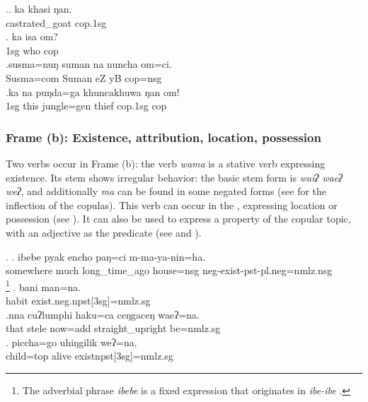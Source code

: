  \ex.\ag. ka khasi ŋan.\\
	 castrated\_goat  {\sc cop.1sg} \\
	 
\bg. ka isa om?\\
{\sc 1sg} who {\sc cop}\\
\bg.susma=nuŋ    suman  na           nuncha           om=ci.\\
Susma{\sc =com} Suman eZ yB {\sc cop=nsg}\\
 
\bg.ka  na   puŋda=ga    khuncakhuwa ŋan    om!\\
{\sc 1sg} this jungle{\sc =gen} thief  {\sc cop.1sg} {\sc cop}\\
 


\subsubsection{Frame (b): Existence, attribution, location, possession}

Two verbs occur in Frame (b): the verb  \emph{wama}   is a stative verb expressing existence.  Its stem shows irregular behavior: the basic stem form is \emph{waiʔ \ti waeʔ \ti weʔ}, and additionally \emph{ma} can be found in some negated forms (see  for the inflection of the copulas). This verb can occur in the , expressing location or possession (see \Next[a]). It can also be used to express a property of the copular topic, with an adjective as the predicate (see \Next[b] and \Next[c]).

	\ex. \ag. ibebe    pyak encho         paŋ=ci    m-ma-ya-nin=ha.\\
somewhere much long\_time\_ago house{\sc =nsg} {\sc neg-}exist{\sc -pst-pl.neg=nmlz.nsg}\\
  \footnote{The adverbial phrase \emph{ibebe} is a fixed expression that originates in  \emph{ibe-ibe} .} 
  \bg. bani man=na.\\
  habit exist{\sc .neg.npst[3sg]=nmlz.sg}\\
	\bg.nna  cuʔlumphi haku=ca   ceŋgaceŋ       waeʔ=na.\\
	that stele now{\sc =add} straight\_upright be{\sc [3sg;npst]=nmlz.sg}\\
 
\bg. piccha=go  uhiŋgilik weʔ=na.\\ 
child{\sc=top} alive exist{\sc npst[3sg]=nmlz.sg}	\\ 
 	


